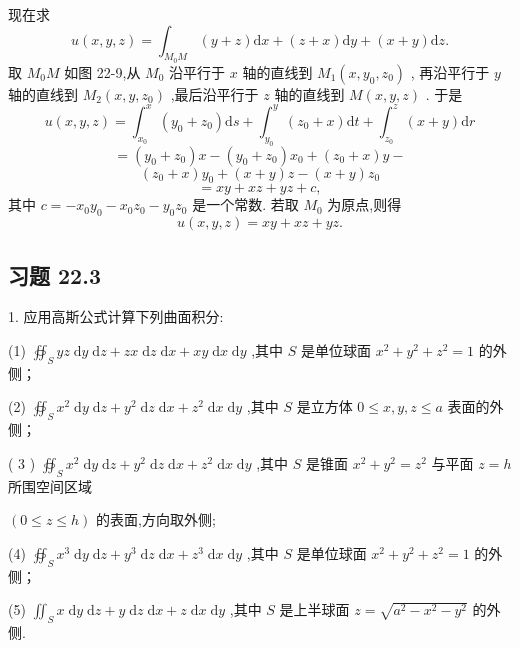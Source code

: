 现在求
\[
u\left( {x,y,z}\right)  = {\int }_{{M}_{0}M}\left( {y + z}\right) \mathrm{d}x + \left( {z + x}\right) \mathrm{d}y + \left( {x + y}\right) \mathrm{d}z.
\]
取 \({M}_{0}M\) 如图 22-9,从 \({M}_{0}\) 沿平行于 \(x\) 轴的直线到 \({M}_{1}\left( {x,{y}_{0},{z}_{0}}\right)\) , 再沿平行于 \(y\) 轴的直线到 \({M}_{2}\left( {x,y,{z}_{0}}\right)\) ,最后沿平行于 \(z\) 轴的直线到 \(M\left( {x,y,z}\right)\) . 于是
\[
u\left( {x,y,z}\right)  = {\int }_{{x}_{0}}^{x}\left( {{y}_{0} + {z}_{0}}\right) \mathrm{d}s + {\int }_{{y}_{0}}^{y}\left( {{z}_{0} + x}\right) \mathrm{d}t + {\int }_{{z}_{0}}^{z}\left( {x + y}\right) \mathrm{d}r
\]
\[
= \left( {{y}_{0} + {z}_{0}}\right) x - \left( {{y}_{0} + {z}_{0}}\right) {x}_{0} + \left( {{z}_{0} + x}\right) y -
\]
\[
\left( {{z}_{0} + x}\right) {y}_{0} + \left( {x + y}\right) z - \left( {x + y}\right) {z}_{0}
\]
\[
= {xy} + {xz} + {yz} + c,
\]
其中 \(c =  - {x}_{0}{y}_{0} - {x}_{0}{z}_{0} - {y}_{0}{z}_{0}\) 是一个常数. 若取 \({M}_{0}\) 为原点,则得
\[
u\left( {x,y,z}\right)  = {xy} + {xz} + {yz}.
\]
\subsection{习题 22.3}

1. 应用高斯公式计算下列曲面积分:

(1) \({\oiint }_{S}{yz}\mathrm{\;d}y\mathrm{\;d}z + {zx}\mathrm{\;d}z\mathrm{\;d}x + {xy}\mathrm{\;d}x\mathrm{\;d}y\) ,其中 \(S\) 是单位球面 \({x}^{2} + {y}^{2} + {z}^{2} = 1\) 的外侧；

(2) \({\oiint }_{S}{x}^{2}\mathrm{\;d}y\mathrm{\;d}z + {y}^{2}\mathrm{\;d}z\mathrm{\;d}x + {z}^{2}\mathrm{\;d}x\mathrm{\;d}y\) ,其中 \(S\) 是立方体 \(0 \leq  x,y,z \leq  a\) 表面的外侧；

( 3 ) \({\oiint }_{S}{x}^{2}\mathrm{\;d}y\mathrm{\;d}z + {y}^{2}\mathrm{\;d}z\mathrm{\;d}x + {z}^{2}\mathrm{\;d}x\mathrm{\;d}y\) ,其中 \(S\) 是锥面 \({x}^{2} + {y}^{2} = {z}^{2}\) 与平面 \(z = h\) 所围空间区域

\(\left( {0 \leq  z \leq  h}\right)\) 的表面,方向取外侧;

(4) \({\oiint }_{S}{x}^{3}\mathrm{\;d}y\mathrm{\;d}z + {y}^{3}\mathrm{\;d}z\mathrm{\;d}x + {z}^{3}\mathrm{\;d}x\mathrm{\;d}y\) ,其中 \(S\) 是单位球面 \({x}^{2} + {y}^{2} + {z}^{2} = 1\) 的外侧；

(5) \({\iint }_{S}x\mathrm{\;d}y\mathrm{\;d}z + y\mathrm{\;d}z\mathrm{\;d}x + z\mathrm{\;d}x\mathrm{\;d}y\) ,其中 \(S\) 是上半球面 \(z = \sqrt{{a}^{2} - {x}^{2} - {y}^{2}}\) 的外侧.


